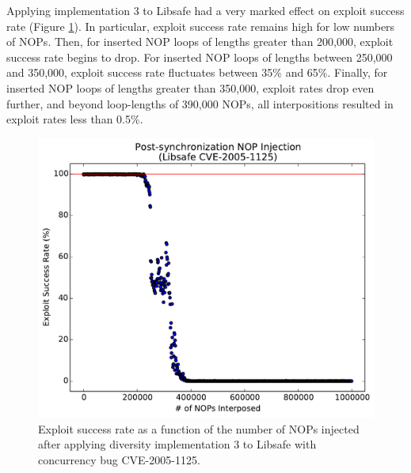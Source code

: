 Applying implementation 3 to Libsafe had a very marked effect on exploit success rate (Figure \ref{fig_libsafe-post}).
In particular, exploit success rate remains high for low numbers of NOPs.
Then, for inserted NOP loops of lengths greater than 200,000, exploit success rate begins to drop.
For inserted NOP loops of lengths between 250,000 and 350,000, exploit success rate fluctuates between 35\% and 65\%.
Finally, for inserted NOP loops of lengths greater than 350,000, exploit rates drop even further, and beyond loop-lengths of 390,000 NOPs, all interpositions resulted in exploit rates less than 0.5\%.
\begin{figure}
	\centering
	\includegraphics[width=\columnwidth]{figures/libsafe-post}
	\caption{Exploit success rate as a function of the number of NOPs injected after applying diversity implementation 3 to Libsafe with concurrency bug CVE-2005-1125.}
	\label{fig_libsafe-post}
\end{figure}


